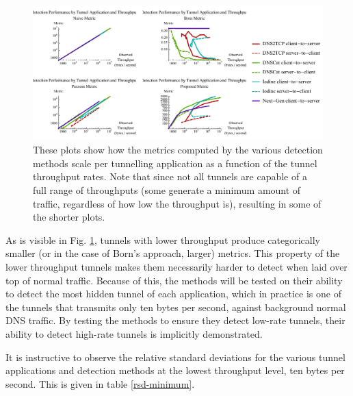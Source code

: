 \documentclass{llncs}
\begin{document}
\begin{figure}
\centering
\includegraphics[width=\textwidth]{../figures/mpbtt.pdf}
\caption[Scaling of Detection Metrics by Tunnel Throughput]{These plots show how
the metrics computed by the various detection methods scale per tunnelling
application as a function of the tunnel throughput rates. Note that since not
all tunnels are capable of a full range of throughputs (some generate a minimum
amount of traffic, regardless of how low the throughput is), resulting in some
of the shorter plots.}
\label{mbtt}
\end{figure}

As is visible in Fig. \ref{mbtt}, tunnels with lower throughput produce
categorically smaller (or in the case of Born's approach, larger) metrics. This
property of the lower throughput tunnels makes them necessarily harder to detect
when laid over top of normal traffic. Because of this, the methods will be
tested on their ability to detect the most hidden tunnel of each application,
which in practice is one of the tunnels that transmits only ten bytes per
second, against background normal DNS traffic. By testing
the methods to ensure they detect low-rate tunnels, their ability to detect
high-rate tunnels is implicitly demonstrated.

It is instructive to observe the relative standard deviations for the various
tunnel applications and detection methods at the lowest throughput level, ten
bytes per second. This is given in table \ref{rsd-minimum}.

\end{document}
